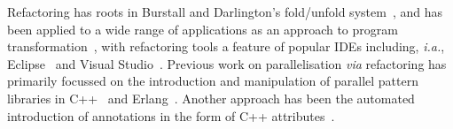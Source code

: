 

Refactoring has roots in Burstall and Darlington's fold/unfold system~\cite{darlington77}, and has been applied to a wide range of applications as an approach to program transformation~\cite{mens_refactoring}, with refactoring tools a feature of popular IDEs including, \textit{i.a.}, Eclipse~\cite{EclipseWeb} and Visual Studio~\cite{VisualStudioWeb}.
Previous work on parallelisation \textit{via} refactoring has primarily focussed on the introduction and manipulation of parallel pattern libraries in C++~\cite{brownagricultural,DBLP:conf/pdp/JanjicBMHDAG16} and Erlang~\cite{hlpp,DBLP:journals/cai/BarwellBHTB16}. Another approach
has been the automated introduction of annotations in the form of
C++ attributes~\cite{rio:2018}.

